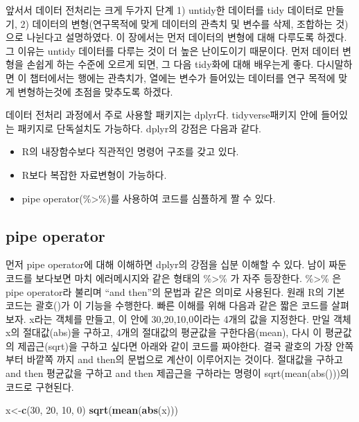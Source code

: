 \documentclass[
]{book}
\newenvironment{Shaded}{\begin{snugshade}}{\end{snugshade}}
\newcommand{\DecValTok}[1]{\textcolor[rgb]{0.00,0.00,0.81}{#1}}
\newcommand{\FunctionTok}[1]{\textcolor[rgb]{0.13,0.29,0.53}{\textbf{#1}}}
\newcommand{\NormalTok}[1]{#1}
\newcommand{\OtherTok}[1]{\textcolor[rgb]{0.56,0.35,0.01}{#1}}
\providecommand{\tightlist}{%
  \setlength{\itemsep}{0pt}\setlength{\parskip}{0pt}}
\begin{document}
앞서서 데이터 전처리는 크게 두가지 단계 1) untidy한 데이터를 tidy 데이터로 만들기, 2) 데이터의 변형(연구목적에 맞게 데이터의 관측치 및 변수를 삭제, 조합하는 것)으로 나뉜다고 설명하였다. 이 장에서는 먼저 데이터의 변형에 대해 다루도록 하겠다. 그 이유는 untidy 데이터를 다루는 것이 더 높은 난이도이기 때문이다. 먼저 데이터 변형을 손쉽게 하는 수준에 오르게 되면, 그 다음 tidy화에 대해 배우는게 좋다. 다시말하면 이 챕터에서는 행에는 관측치가, 열에는 변수가 들어있는 데이터를 연구 목적에 맞게 변형하는것에 초점을 맞추도록 하겠다.

데이터 전처리 과정에서 주로 사용할 패키지는 dplyr다. tidyverse패키지 안에 들어있는 패키지로 단독설치도 가능하다. dplyr의 강점은 다음과 같다.

\begin{itemize}
\tightlist
\item
  R의 내장함수보다 직관적인 명령어 구조를 갖고 있다.
\item
  R보다 복잡한 자료변형이 가능하다.
\item
  pipe operator(\%\textgreater\%)를 사용하여 코드를 심플하게 짤 수 있다.
\end{itemize}

\subsection{pipe operator}\label{pipe-operator}

먼저 pipe operator에 대해 이해하면 dplyr의 강점을 십분 이해할 수 있다. 남이 짜둔 코드를 보다보면 마치 에러메시지와 같은 형태의 \%\textgreater\% 가 자주 등장한다. \%\textgreater\% 은 pipe operator라 불리며 ``and then''의 문법과 같은 의미로 사용된다. 원래 R의 기본 코드는 괄호()가 이 기능을 수행한다.
빠른 이해를 위해 다음과 같은 짧은 코드를 살펴보자. x라는 객체를 만들고, 이 안에 30,20,10,0이라는 4개의 값을 지정한다. 만일 객체 x의 절대값(abs)을 구하고, 4개의 절대값의 평균값을 구한다음(mean), 다시 이 평균값의 제곱근(sqrt)을 구하고 싶다면 아래와 같이 코드를 짜야한다. 결국 괄호의 가장 안쪽부터 바깥쪽 까지 and then의 문법으로 계산이 이루어지는 것이다. 절대값을 구하고 and then 평균값을 구하고 and then 제곱근을 구하라는 명령이 sqrt(mean(abs()))의 코드로 구현된다.

\begin{Shaded}
\begin{Highlighting}[]
\NormalTok{x}\OtherTok{\textless{}{-}}\FunctionTok{c}\NormalTok{(}\DecValTok{30}\NormalTok{, }\DecValTok{20}\NormalTok{, }\DecValTok{10}\NormalTok{, }\DecValTok{0}\NormalTok{)}
\FunctionTok{sqrt}\NormalTok{(}\FunctionTok{mean}\NormalTok{(}\FunctionTok{abs}\NormalTok{(x)))}
\end{Highlighting}
\end{Shaded}
\end{document}
